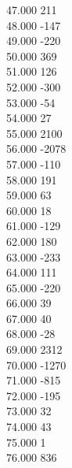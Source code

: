 { 47.000	211 \\
 48.000	-147 \\
 49.000	-220 \\
 50.000	369 \\
 51.000	126 \\
 52.000	-300 \\
 53.000	-54 \\
 54.000	27 \\
 55.000	2100 \\
 56.000	-2078 \\
 57.000	-110 \\
 58.000	191 \\
 59.000	63 \\
 60.000	18 \\
 61.000	-129 \\
 62.000	180 \\
 63.000	-233 \\
 64.000	111 \\
 65.000	-220 \\
 66.000	39 \\
 67.000	40 \\
 68.000	-28 \\
 69.000	2312 \\
 70.000	-1270 \\
 71.000	-815 \\
 72.000	-195 \\
 73.000	32 \\
 74.000	43 \\
 75.000	1 \\
 76.000	836 \\
}
